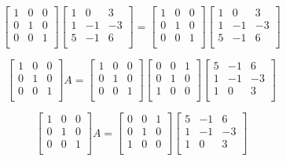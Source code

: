 \documentclass{article}
\begin{document}
$$
\begin{bmatrix}
    1 & 0 & 0 \\
    0 & 1 & 0 \\
    0 & 0 & 1 \\
\end{bmatrix}
\begin{bmatrix}
    1  & 0 & 3 \\
    1 & -1 & -3 \\
    5  & -1 & 6 \\
\end{bmatrix} = 
\begin{bmatrix}
    1 & 0 & 0 \\
    0 & 1 & 0 \\
    0 & 0 & 1 \\
\end{bmatrix}
\begin{bmatrix}
    1  & 0 & 3 \\
    1 & -1 & -3 \\
    5  & -1 & 6 \\
\end{bmatrix}
  $$


  $$
  \begin{bmatrix}
      1 & 0 & 0 \\
      0 & 1 & 0 \\
      0 & 0 & 1 \\
  \end{bmatrix}
  A = 
  \begin{bmatrix}
      1 & 0 & 0 \\
      0 & 1 & 0 \\
      0 & 0 & 1 \\
  \end{bmatrix}
  \begin{bmatrix}
    0 & 0 & 1 \\
    0 & 1 & 0 \\
    1 & 0 & 0 \\
\end{bmatrix}
  \begin{bmatrix}
    5  & -1 & 6 \\
      1 & -1 & -3 \\
      1  & 0 & 3 \\
  \end{bmatrix}
    $$

    $$
    \begin{bmatrix}
        1 & 0 & 0 \\
        0 & 1 & 0 \\
        0 & 0 & 1 \\
    \end{bmatrix}
    A = 
    \begin{bmatrix}
      0 & 0 & 1 \\
      0 & 1 & 0 \\
      1 & 0 & 0 \\
  \end{bmatrix}
    \begin{bmatrix}
      5  & -1 & 6 \\
        1 & -1 & -3 \\
        1  & 0 & 3 \\
    \end{bmatrix}
      $$
\end{document}
